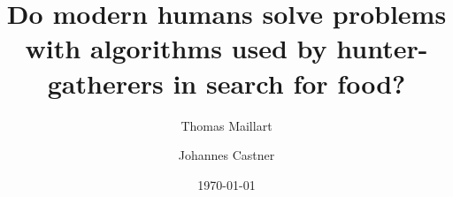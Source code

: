\documentclass[12pt]{revtex4}
\begin{document}
\title{Do modern humans solve problems with algorithms used by hunter-gatherers in search for food?}

\author{Thomas Maillart}

\author{Johannes Castner}


\date{\today}


\begin{abstract}

\end{abstract}

\maketitle





%



\clearpage
%




\clearpage
%

\renewcommand\thesection{S\arabic{section}}
\setcounter{section}{0}

\renewcommand\theequation{S\arabic{equation}}
\setcounter{equation}{0}



%
%
%
%
\end{document}
